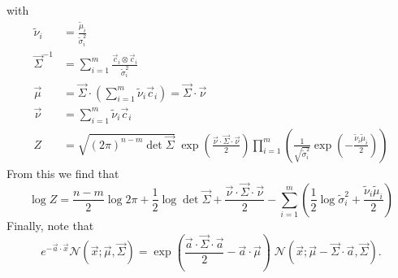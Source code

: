 \documentclass[11pt,twoside]{report}
\def\includebibliography{}
\begin{document}
with
\begin{subequations}
\begin{align}
  \tilde{\nu}_i &= \frac{\tilde{\mu}_i}{\tilde{\sigma}_i^2} \\
  \vec{\Sigma}^{-1} &= \sum_{i=1}^m \frac{\vec{c}_i \otimes \vec{c}_i}{\tilde{\sigma}_i^2}
  \label{eq:combined-normals-sigma}
  \\
  \vec{\mu} &=
  \vec{\Sigma} \cdot \left( \sum_{i=1}^m \tilde{\nu}_i \vec{c}_i \right)
  = \vec{\Sigma} \cdot \vec{\nu}
  \\
  \vec{\nu} &= \sum_{i=1}^m \tilde{\nu}_i \vec{c}_i
  \label{eq:combined-normals-nu}
  \\
  Z &=
  \sqrt{ (2\pi)^{n-m} \det{\vec{\Sigma}} }
  \;
  \exp{\left( \frac{\vec{\nu} \cdot \vec{\Sigma} \cdot \vec{\nu}}{2} \right)}
  \prod_{i=1}^m
  \left(
  \frac{1}{\sqrt{ \tilde{\sigma}_i^2 }}
  \exp{\left(-\frac{\tilde{\nu}_i \tilde{\mu}_i}{2}\right)}
  \right)
  \label{eq:combined-normals-Z}
\end{align}
\end{subequations}
From this we find that
\begin{equation}
  \log{Z} =
  \frac{n-m}{2} \log{2\pi} +
  \frac{1}{2} \log\det{\vec{\Sigma}} +
  \frac{\vec{\nu} \cdot \vec{\Sigma} \cdot \vec{\nu}}{2} -
  \sum_{i=1}^m
  \left(
  \frac{1}{2} \log{\tilde{\sigma}_i^2} +
  \frac{\tilde{\nu}_i \tilde{\mu}_i}{2}
  \right)
\end{equation}
Finally, note that
\begin{equation}\label{eq:biased-normal}
  e^{-\vec{a} \cdot \vec{x}} \mathcal{N}(\vec{x}; \vec{\mu}, \vec{\Sigma})
  =
  \exp{\left( \frac{\vec{a} \cdot \vec{\Sigma} \cdot \vec{a}}{2} - \vec{a} \cdot \vec{\mu} \right)} \;
  \mathcal{N}(\vec{x}; \vec{\mu} - \vec{\Sigma}\cdot\vec{a}, \vec{\Sigma}).
\end{equation}

\ifdefined\includebibliography
  \printbibliography
\fi
\end{document}
